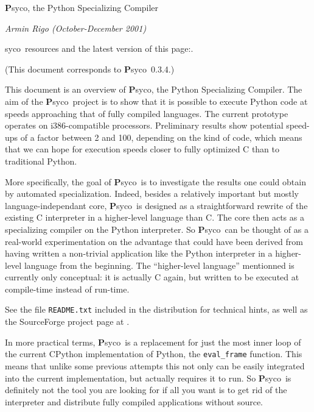 \documentclass{article}
\def\Psyco{{\bf P}syco}
\def\code#1{\texttt{#1}}
\begin{document}
{\hfill\Large \Psyco, the Python Specializing Compiler \hfill}

\bigskip

{\hfill\it Armin Rigo \hfill (October-December 2001) \hfill}

\bigskip

\noindent\Psyco\ resources and the latest version of this page:\hfill\break {}.

(This document corresponds to \Psyco\ 0.3.4.)

\bigskip

This document is an overview of \Psyco, the Python Specializing Compiler. The aim of the \Psyco\ project is to show that it is possible to execute Python code at speeds approaching that of fully compiled languages. The current prototype operates on i386-compatible processors. Preliminary results show potential speed-ups of a factor between 2 and 100, depending on the kind of code, which means that we can hope for execution speeds closer to fully optimized C than to traditional Python.

More specifically, the goal of \Psyco\ is to investigate the results one could obtain by automated specialization. Indeed, besides a relatively important but mostly language-independant core, \Psyco\ is designed as a straightforward rewrite of the existing C interpreter in a higher-level language than C. The core then acts as a specializing compiler on the Python interpreter. So \Psyco\ can be thought of as a real-world experimentation on the advantage that could have been derived from having written a non-trivial application like the Python interpreter in a higher-level language from the beginning. The ``higher-level language'' mentionned is currently only conceptual: it is actually C again, but written to be executed at compile-time instead of run-time.

See the file \code{README.txt} included in the distribution for technical hints, as well as the SourceForge project page at .

\medskip

In more practical terms, \Psyco\ is a replacement for just the most inner loop of the current CPython implementation of Python, the \code{eval\_frame} function. This means that unlike some previous attempts this not only can be easily integrated into the current implementation, but actually requires it to run. So \Psyco\ is definitely not the tool you are looking for if all you want is to get rid of the interpreter and distribute fully compiled applications without source.
\end{document}
